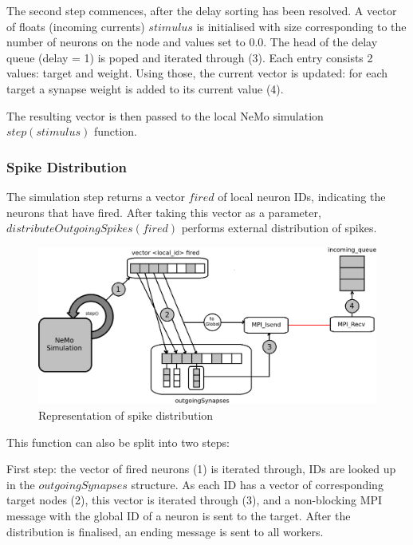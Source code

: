 The second step commences, after the delay sorting has been resolved. A vector of floats (incoming currents) $stimulus$ is initialised with size corresponding to the number of neurons on the node and values set to 0.0. The head of the delay queue (delay = 1) is poped and iterated through (3). Each entry consists 2 values: target and weight. Using those, the current vector is updated: for each target a synapse weight is added to its current value (4).

The resulting vector is then passed to the local NeMo simulation $step(stimulus)$ function.

\subsubsection{Spike Distribution}

The simulation step returns a vector $fired$ of local neuron IDs, indicating the neurons that have fired. After taking this vector as a parameter, $distributeOutgoingSpikes(fired)$ performs external distribution of spikes.

\begin{figure}[h]
\begin{center}
\includegraphics[scale = 0.5]{images/implementation/spike_distribution_scheme.png}
\end{center}
\caption{Representation of spike distribution}
\end{figure}

This function can also be split into two steps:

First step: the vector of fired neurons (1) is iterated through, IDs are looked up in the $outgoingSynapses$ structure. As each ID has a vector of corresponding target nodes (2), this vector is iterated through (3), and a non-blocking MPI message with the global ID of a neuron is sent to the target. After the distribution is finalised, an ending message is sent to all workers.

